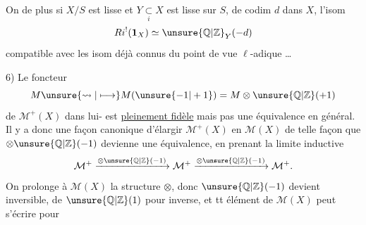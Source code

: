 On  de plus  si $X/S$ est
lisse et $Y\underset{i}{\subset}X$ est lisse sur $S$, de codim
$d$ dans $X$, l'isom
\[
Ri^!(\mathbf1_X)\simeq \unsure{\mathbb{Q}|\mathbb{Z}}_Y(-d)
\]
compatible avec les isom déjà connus
du point de vue $\ell$-adique \ldots

6) 
Le foncteur
\[
M\unsure{\rightsquigarrow|\longmapsto}M(\unsure{-1|+1})=M\otimes\unsure{\mathbb{Q}|\mathbb{Z}}(+1)
\]
de $\mathcal{M}^+(X)$ dans lui- est \uline{pleinement fidèle}
mais pas une équivalence en général.
Il y a donc une façon canonique
d'élargir $\mathcal{M}^+(X)$ en $\mathcal{M}(X)$ de telle façon
que $\otimes\unsure{\mathbb{Q}|\mathbb{Z}}(-1)$ devienne une équivalence,
en prenant la limite inductive
\[
\mathcal{M}^+\xrightarrow{\otimes\unsure{\mathbb{Q}|\mathbb{Z}}(-1)}\mathcal{M}^+
\xrightarrow{\otimes\unsure{\mathbb{Q}|\mathbb{Z}}(-1)}\mathcal{M}^+.
\]
On prolonge
à $\mathcal{M}(X)$ la structure $\otimes$, donc $\unsure{\mathbb{Q}|\mathbb{Z}}(-1)$
devient inversible, de $\unsure{\mathbb{Q}|\mathbb{Z}}(1)$ pour inverse, et
tt élément de $\mathcal{M}(X)$ peut s'écrire pour
